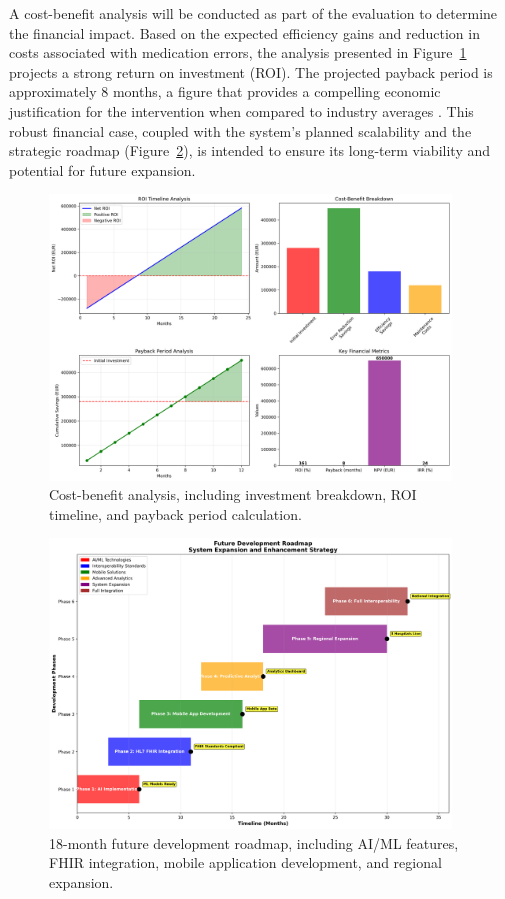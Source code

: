 A cost-benefit analysis will be conducted as part of the evaluation to determine the financial impact. Based on the expected efficiency gains and reduction in costs associated with medication errors, the analysis presented in Figure~\ref{fig:roi-analysis} projects a strong return on investment (ROI). The projected payback period is approximately 8 months, a figure that provides a compelling economic justification for the intervention when compared to industry averages \cite{adler2021}. This robust financial case, coupled with the system's planned scalability and the strategic roadmap (Figure~\ref{fig:future-roadmap}), is intended to ensure its long-term viability and potential for future expansion.

\begin{figure}[htbp]
    \centering
    \includegraphics[width=0.95\textwidth]{images/generated/roi_analysis.png}
    \caption{Cost-benefit analysis, including investment breakdown, ROI timeline, and payback period calculation.}
    \label{fig:roi-analysis}
\end{figure}

\begin{figure}[htbp]
    \centering
    \includegraphics[width=0.95\textwidth]{images/generated/future_roadmap.png}
    \caption{18-month future development roadmap, including AI/ML features, FHIR integration, mobile application development, and regional expansion.}
    \label{fig:future-roadmap}
\end{figure}

